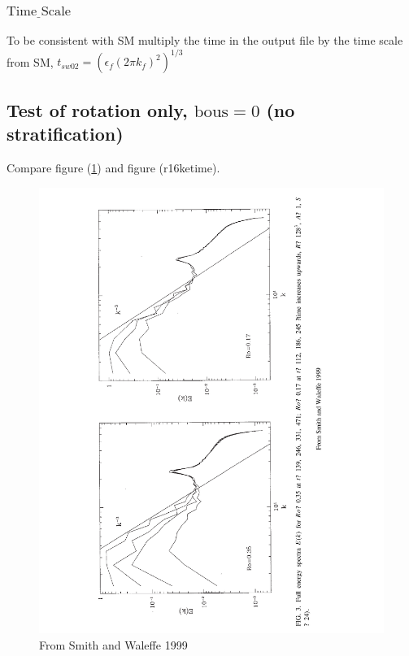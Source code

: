 \documentclass[12pt]{article}
\begin{document}
\subsubsection*{$\underline{\text{Time Scale}}$}
To be consistent with SM multiply the time in the output file by the
time scale from SM, $t_{sw02} = (\epsilon_f (2 \pi k_f)^2)^{1/3}$


\subsection{Test of rotation only, $\text{bous} = 0$ (no stratification)}

Compare figure (\ref{fig:SW99Fig3}) and figure (r16ketime).

\begin{figure}
\begin{center}
\includegraphics[angle=-90,width=6.in]{SW99Fig3}
\caption{From Smith and Waleffe 1999}
\label{fig:SW99Fig3}
\end{center}
\end{figure}
\end{document}
